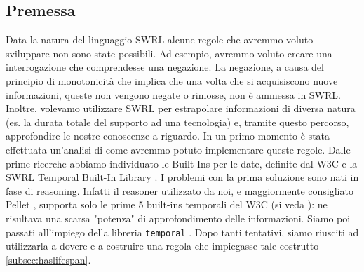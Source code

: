 \subsection{Premessa}\label{subsec:premswrl}
Data la natura del linguaggio SWRL alcune regole che avremmo voluto sviluppare non sono state possibili. Ad esempio, avremmo voluto creare una interrogazione che comprendesse una negazione. La negazione, a causa del principio di monotonicità che implica che una volta che si acquisiscono nuove informazioni, queste non vengono negate o rimosse, non è ammessa in SWRL.\\

Inoltre, volevamo utilizzare SWRL per estrapolare informazioni di diversa natura (es. la durata totale del supporto ad una tecnologia) e, tramite questo percorso, approfondire le nostre conoscenze a riguardo. In un primo momento è stata effettuata un'analisi di come avremmo potuto implementare queste regole. Dalle prime ricerche abbiamo individuato le Built-Ins per le date, definite dal W3C \cite{datetime_builtin} e la SWRL Temporal Built-In Library \cite{SWRLTemporalBuiltInsBasic}. I problemi con la prima soluzione sono nati in fase di reasoning. Infatti il reasoner utilizzato da noi, e maggiormente consigliato Pellet \cite{pelletreasoner}, supporta solo le prime 5 built-ins temporali del W3C \cite{datetime_builtin} (si veda \cite{pelletsupporttime}): ne risultava una scarsa "potenza" di approfondimento delle informazioni. Siamo poi passati all'impiego della libreria \texttt{temporal} \cite{SWRLTemporalBuiltInsBasic}. Dopo tanti tentativi, siamo riusciti ad utilizzarla a dovere e a costruire una regola che impiegasse tale costrutto \ref{subsec:haslifespan}.\\

